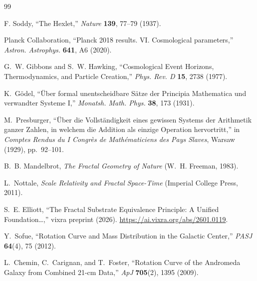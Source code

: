 \documentclass[11pt,a4paper]{article}
\begin{document}

\begin{thebibliography}{99}

F. Soddy, ``The Hexlet,'' \emph{Nature} \textbf{139}, 77--79 (1937).

Planck Collaboration, ``Planck 2018 results. VI. Cosmological parameters,''
\textit{Astron. Astrophys.} \textbf{641}, A6 (2020).

G.~W. Gibbons and S.~W. Hawking,
``Cosmological Event Horizons, Thermodynamics, and Particle Creation,''
\textit{Phys. Rev. D} \textbf{15}, 2738 (1977).

K.~Gödel, ``Über formal unentscheidbare Sätze der Principia Mathematica und
verwandter Systeme I,'' \textit{Monatsh. Math. Phys.} \textbf{38}, 173
(1931).

M.~Presburger, ``Über die Vollständigkeit eines gewissen Systems der
Arithmetik ganzer Zahlen, in welchem die Addition als einzige Operation
hervortritt,'' in \textit{Comptes Rendus du I Congrès de Mathématiciens des
Pays Slaves}, Warsaw (1929), pp.~92--101.

B.~B. Mandelbrot, \textit{The Fractal Geometry of Nature} (W.~H. Freeman,
1983).

L.~Nottale, \textit{Scale Relativity and Fractal Space-Time} (Imperial
College Press, 2011).

S.~E. Elliott, ``The Fractal Substrate Equivalence Principle: A Unified
Foundation\ldots,'' vixra preprint (2026).
\url{https://ai.vixra.org/abs/2601.0119}.

Y.~Sofue, ``Rotation Curve and Mass Distribution in the Galactic Center,''
\textit{PASJ} \textbf{64}(4), 75 (2012).

L.~Chemin, C.~Carignan, and T.~Foster, ``Rotation Curve of the Andromeda
Galaxy from Combined 21-cm Data,'' \textit{ApJ} \textbf{705}(2), 1395
(2009).


\end{thebibliography}
\end{document}
